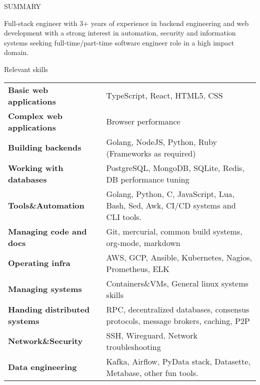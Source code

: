 \documentclass{resume} %
\begin{document}

\begin{rSection}{SUMMARY}

  {Full-stack engineer with 3+ years of experience in backend engineering and web development with a strong interest in automation, security and information systems seeking full-time/part-time software engineer role in a high impact domain.}


\end{rSection}

\begin{rSection}{Relevant skills}
  \begin{tabular}{ @{} >{\bfseries}l @{\hspace{6ex}} l }
    Basic web applications & TypeScript, React, HTML5, CSS\\
    Complex web applications & Browser performance\\
    Building backends & Golang, NodeJS, Python, Ruby (Frameworks as required)\\
    Working with databases & PostgreSQL, MongoDB, SQLite, Redis, DB performance tuning\\
    Tools\&Automation & Golang, Python, C, JavaScript, Lua, Bash, Sed, Awk, CI/CD systems and CLI tools.\\
    Managing code and docs & Git, mercurial, common build systems, org-mode, markdown\\
    Operating infra & AWS, GCP, Ansible, Kubernetes, Nagios, Prometheus, ELK\\
    Managing systems & Containers\&VMs, General linux systems skills\\
    Handing distributed systems & RPC, decentralized databases, consensus protocols, message brokers, caching, P2P\\
    Network\&Security & SSH, Wireguard, Network troubleshooting\\
    Data engineering & Kafka, Airflow, PyData stack, Datasette, Metabase, other fun tools.\\
  \end{tabular}\
\end{rSection}
\end{document}

